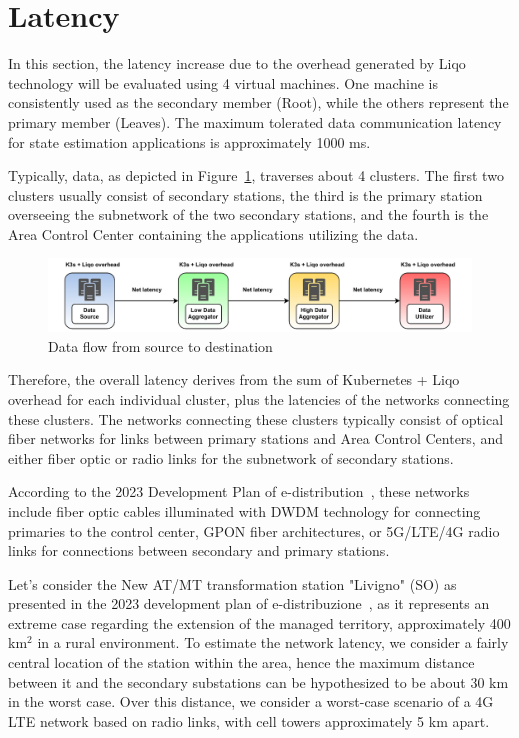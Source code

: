 \section{Latency}
In this section, the latency increase due to the overhead generated by Liqo technology will be evaluated using 4 virtual machines. One machine is consistently used as the secondary member (Root), while the others represent the primary member (Leaves). The maximum tolerated data communication latency for state estimation applications is approximately 1000 ms.

Typically, data, as depicted in Figure~\ref{fig:latency}, traverses about 4 clusters. The first two clusters usually consist of secondary stations, the third is the primary station overseeing the subnetwork of the two secondary stations, and the fourth is the Area Control Center containing the applications utilizing the data.

\begin{figure}[ht]\centering
\includegraphics[scale=0.9]{Pictures/latency-schema}
\caption{Data flow from source to destination}\label{fig:latency}
\end{figure}

Therefore, the overall latency derives from the sum of Kubernetes + Liqo overhead for each individual cluster, plus the latencies of the networks connecting these clusters. The networks connecting these clusters typically consist of optical fiber networks for links between primary stations and Area Control Centers, and either fiber optic or radio links for the subnetwork of secondary stations.

According to the 2023 Development Plan of e-distribution~\cite{e2-1}, these networks include fiber optic cables illuminated with DWDM technology for connecting primaries to the control center, GPON fiber architectures, or 5G/LTE/4G radio links for connections between secondary and primary stations.

Let's consider the New AT/MT transformation station "Livigno" (SO) as presented in the 2023 development plan of e-distribuzione~\cite{e2-2}, as it represents an extreme case regarding the extension of the managed territory, approximately 400 km$^2$ in a rural environment. To estimate the network latency, we consider a fairly central location of the station within the area, hence the maximum distance between it and the secondary substations can be hypothesized to be about 30 km in the worst case. Over this distance, we consider a worst-case scenario of a 4G LTE network based on radio links, with cell towers approximately 5 km apart.

